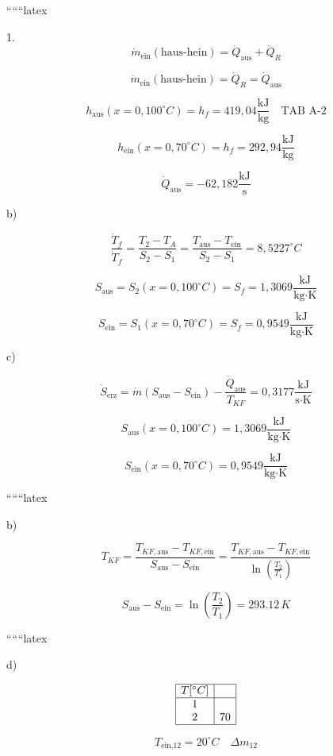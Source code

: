 
``````latex


1. 
\[
\dot{m}_{\text{ein}} (\text{haus-hein}) = \dot{Q}_{\text{aus}} + \dot{Q}_{R}
\]

\[
\dot{m}_{\text{ein}} (\text{haus-hein}) = \dot{Q}_{R} = \dot{Q}_{\text{aus}}
\]

\[
h_{\text{aus}} (x = 0, 100^\circ C) = h_f = 419,04 \frac{\text{kJ}}{\text{kg}} \quad \text{TAB A-2}
\]

\[
h_{\text{ein}} (x = 0, 70^\circ C) = h_f = 292,94 \frac{\text{kJ}}{\text{kg}}
\]

\[
\dot{Q}_{\text{aus}} = -62,182 \frac{\text{kJ}}{\text{s}}
\]

b) 

\[
\frac{\dot{T}_f}{\dot{T}_f} = \frac{T_2 - T_A}{S_2 - S_1} = \frac{T_{\text{aus}} - T_{\text{ein}}}{S_2 - S_1} = 8,5227^\circ C
\]

\[
S_{\text{aus}} = S_2 (x = 0, 100^\circ C) = S_f = 1,3069 \frac{\text{kJ}}{\text{kg} \cdot \text{K}}
\]

\[
S_{\text{ein}} = S_1 (x = 0, 70^\circ C) = S_f = 0,9549 \frac{\text{kJ}}{\text{kg} \cdot \text{K}}
\]

c) 

\[
\dot{S}_{\text{erz}} = \dot{m} (S_{\text{aus}} - S_{\text{ein}}) - \frac{\dot{Q}_{\text{aus}}}{T_{KF}} = 0,3177 \frac{\text{kJ}}{\text{s} \cdot \text{K}}
\]

\[
S_{\text{aus}} (x = 0, 100^\circ C) = 1,3069 \frac{\text{kJ}}{\text{kg} \cdot \text{K}}
\]

\[
S_{\text{ein}} (x = 0, 70^\circ C) = 0,9549 \frac{\text{kJ}}{\text{kg} \cdot \text{K}}
\]

``````latex

b)

\[
T_{KF} = \frac{T_{KF, \text{aus}} - T_{KF, \text{ein}}}{S_{\text{aus}} - S_{\text{ein}}} = \frac{T_{KF, \text{aus}} - T_{KF, \text{ein}}}{\ln \left( \frac{T_2}{T_1} \right)}
\]

\[
S_{\text{aus}} - S_{\text{ein}} = \ln \left( \frac{T_2}{T_1} \right) = 293.12 \, K
\]

``````latex


d)

\[
\begin{array}{|c|c|}
\hline
T [^\circ C] & \\
\hline
1 & \\
2 & 70 \\
\hline
\end{array}
\]

\[
T_{\text{ein,12}} = 20^\circ C \quad \Delta m_{12}
\]

